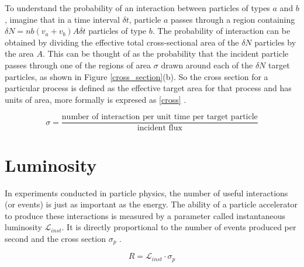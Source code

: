 To understand the probability of an interaction between particles of types $a$ and $b$, imagine that in a time interval $\delta t$, particle $a$ passes through a region containing $\delta N= nb(v_{a}+v_{b}) A \delta t$ particles of type $b$. The probability of interaction can be obtained by dividing the effective total cross-sectional area of the $\delta N$ particles by the area $A$. This can be thought of as the probability that the incident particle passes through one of the regions of area $\sigma$ drawn around each of the $\delta N$ target particles, as shown in Figure \ref{cross_section}(b). So the cross section for a particular process is defined as the effective target area for that process and has units of area, more formally is expresed as \ref{cross} \cite{thomson_2013}.

\begin{equation}
\sigma=\frac{\text{number of interaction per unit time per target particle}}{\text{incident flux}}
\label{cross}
\end{equation}







\section{Luminosity }

In experiments conducted in particle physics, the number of useful interactions (or events) is just as important as the energy. The ability of a particle accelerator to produce these interactions is measured by a parameter called instantaneous luminosity $\mathcal{L}_{inst}$. It is directly proportional to the number of events produced per second and the cross section $\sigma_{p}$ \cite{concept_of_luminosity}.

\begin{equation}
R=\mathcal{L}_{inst} \cdot \sigma_{p}
\end{equation}

